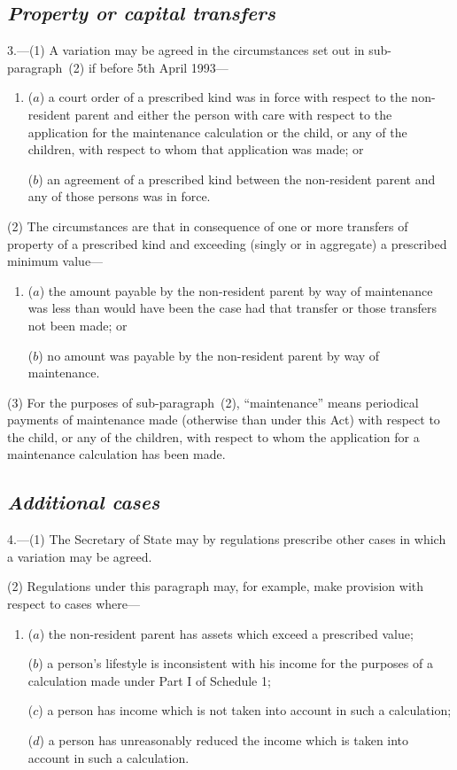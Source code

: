 \documentclass[12pt,a4paper]{article}
\begin{document}
\subsection*{\itshape Property or capital transfers}

3.---(1) A variation may be agreed in the circumstances set out in sub-paragraph~(2)  if before 5th April 1993—
\begin{enumerate}\item[]
($a$) a court order of a prescribed kind was in force with respect to the non-resident parent and either the person with care with respect to the application for the maintenance calculation or the child, or any of the children, with respect to whom that application was made; or

($b$) an agreement of a prescribed kind between the non-resident parent and any of those persons was in force.
\end{enumerate}

(2) The circumstances are that in consequence of one or more transfers of property of a prescribed kind and exceeding (singly or in aggregate) a prescribed minimum value—
\begin{enumerate}\item[]
($a$) the amount payable by the non-resident parent by way of maintenance was less than would have been the case had that transfer or those transfers not been made; or

($b$) no amount was payable by the non-resident parent by way of maintenance.
\end{enumerate}

(3) For the purposes of sub-paragraph~(2), “maintenance” means periodical payments of maintenance made (otherwise than under this Act) with respect to the child, or any of the children, with respect to whom the application for a maintenance calculation has been made.

\subsection*{\itshape Additional cases}

4.---(1) The Secretary of State may by regulations prescribe other cases in which a variation may be agreed.

(2) Regulations under this paragraph may, for example, make provision with respect to cases where—
\begin{enumerate}\item[]
($a$) the non-resident parent has assets which exceed a prescribed value;

($b$) a person’s lifestyle is inconsistent with his income for the purposes of a calculation made under Part I of Schedule 1;

($c$) a person has income which is not taken into account in such a calculation;

($d$) a person has unreasonably reduced the income which is taken into account in such a calculation.
\end{enumerate}
\end{document}
